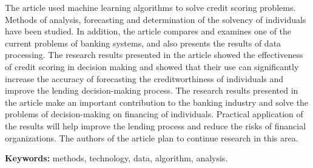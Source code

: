 The article used machine learning algorithms to solve credit scoring
problems. Methods of analysis, forecasting and determination of the
solvency of individuals have been studied. In addition, the article
compares and examines one of the current problems of banking systems,
and also presents the results of data processing. The research results
presented in the article showed the effectiveness of credit scoring in
decision making and showed that their use can significantly increase the
accuracy of forecasting the creditworthiness of individuals and improve
the lending decision-making process. The research results presented in
the article make an important contribution to the banking industry and
solve the problems of decision-making on financing of individuals.
Practical application of the results will help improve the lending
process and reduce the risks of financial organizations. The authors of
the article plan to continue research in this area.

{\bfseries Keywords:} methods, technology, data, algorithm, analysis.



